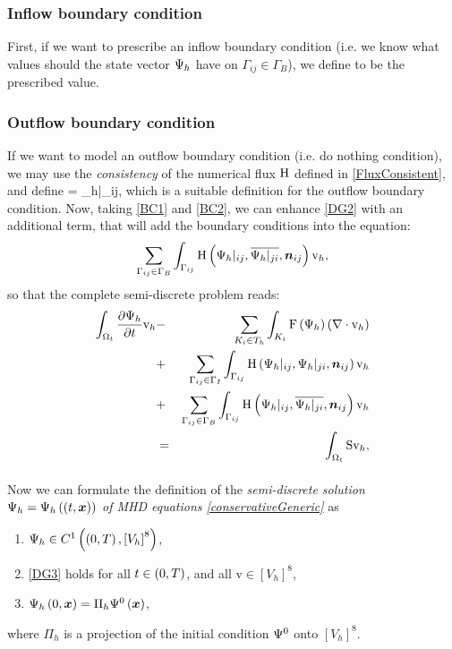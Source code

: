 \subsubsection{Inflow boundary condition}
First, if we want to prescribe an inflow boundary condition (i.e. we know what values should the state vector $\mathrm{\Psi}_h$ have on ${\Gamma_{ij}}\in\Gamma_B$), we define
\be
\label{BC1} 
\ee
to be the prescribed value.

\subsubsection{Outflow boundary condition}
If we want to model an outflow boundary condition (i.e. do nothing condition), we may use the \textit{consistency} of the numerical flux $\mathrm{H}$ defined in \ref{FluxConsistent}, and define
\be
\label{BC2}  = {\mrPsi_h}|_{ij},
\ee
which is a suitable definition for the outflow boundary condition.
Now, taking \ref{BC1} and \ref{BC2}, we can enhance \ref{DG2} with an additional term, that will add the boundary conditions into the equation:
$$
\sum_{\Gamma_{ij}\in\Gamma_B} \int_{\Gamma_{ij}} \mathrm{H}\left({\mathrm{\Psi}_h}|_{ij}, \overline{{\mathrm{\Psi}_h}|_{ji}}, \mbox{\boldmath $n$}_{ij}\right) \mathrm{v}_h,
$$
so that the complete semi-discrete problem reads:
\begin{eqnarray}
\label{DG3} \int_{\Omega_{t}} \frac{\partial{{\mathrm{\Psi}_h}}}{\partial{t}} \mathrm{v}_h & - & \sum_{K_i \in T_h}\int_{K_i}\mathrm{F}\left({\mathrm{\Psi}_h}\right) \left(\nabla \cdot \mathrm{v}_h\right)\\ \nonumber & + & \sum_{\Gamma_{ij}\in\Gamma_I} \int_{\Gamma_{ij}} \mathrm{H}\left({\mathrm{\Psi}_h}|_{ij}, {\mathrm{\Psi}_h}|_{ji}, \mbox{\boldmath $n$}_{ij}\right) \mathrm{v}_h\\\nonumber
 & + & \sum_{\Gamma_{ij}\in\Gamma_B} \int_{\Gamma_{ij}} \mathrm{H}\left({\mathrm{\Psi}_h}|_{ij}, \overline{{\mathrm{\Psi}_h}|_{ji}}, \mbox{\boldmath $n$}_{ij}\right) \mathrm{v}_h\\\nonumber
 & = & \int_{\Omega_{t}} \mathrm{S} \mathrm{v}_h,
\end{eqnarray}

\paragraph{}
Now we can formulate the definition of the \textit{semi-discrete solution ${\mathrm{\Psi}_h} = {\mathrm{\Psi}_h}\left((t, \mbox{\boldmath $x$}\right))$ of MHD equations \ref{conservativeGeneric}} as
\begin{enumerate}
    \label{discreteSlnDef}
    \item ${\mathrm{\Psi}_h} \in C^{1}\left(\left(0, T\right), \left[V_h\right]^8\right)$,
    \item \ref{DG3} holds for all $t\in\left(0, T\right)$, and all $\mathrm{v}\in \left[V_h\right]^8$,
    \item ${\mathrm{\Psi}_h}\left(0, \mbox{\boldmath $x$}\right) = \Pi_h \mathrm{\Psi}^0\left(\mbox{\boldmath $x$}\right)$,
\end{enumerate}
where $\Pi_h$ is a projection of the initial condition $\mathrm{\Psi}^0$ onto $\left[V_h\right]^8$.


